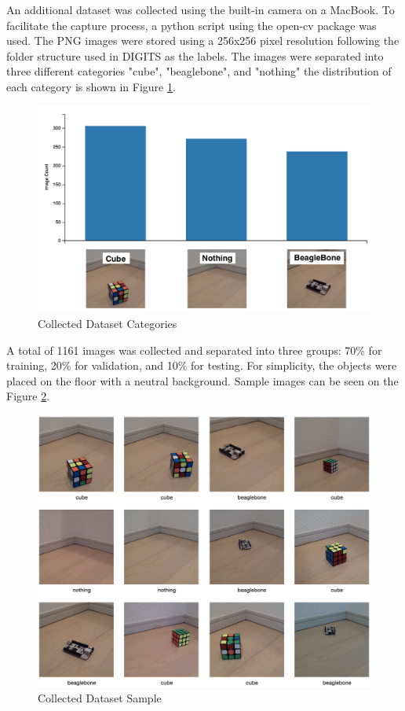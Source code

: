 \documentclass[10pt,journal,compsoc]{IEEEtran}
\begin{document}
An additional dataset was collected using the built-in camera on a MacBook. To facilitate the capture process, a python script using the open-cv package was used. The PNG images were stored using a 256x256 pixel resolution following the folder structure used in DIGITS as the labels. 
The images were separated into three different categories "cube", "beaglebone", and "nothing" the distribution of each category is shown in Figure \ref{fig:categories}.
\begin{figure}[thpb]
      \centering
      \includegraphics[width=\linewidth]{o_dataset_categories.png}
      \caption{Collected Dataset Categories}
      \label{fig:categories}
\end{figure}

A total of 1161 images was collected and separated into three groups: 70\% for training, 20\% for validation, and 10\% for testing. For simplicity, the objects were placed on the floor with a neutral background. Sample images can be seen on the Figure \ref{fig:collected_sample}.
\begin{figure}[thpb]
      \centering
      \includegraphics[width=\linewidth]{o_dataset_sample.png}
      \caption{Collected Dataset Sample}
      \label{fig:collected_sample}
\end{figure}
\end{document}
